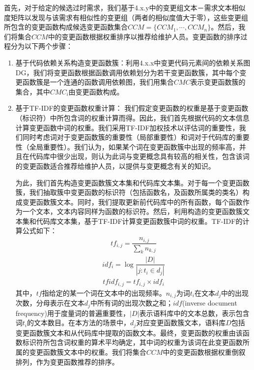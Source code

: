 首先，对于给定的候选过时需求，我们基于4.x.y中的变更组文本－需求文本相似度矩阵以发现与该需求有相似性的变更组（两者的相似度值大于零），这些变更组所包含的变更函数构成候选变更函数集合$CCM = \{CCM_{1}, \cdots, CCM_{n}\}$。然后，我们将集合$CCM$中的变更函数根据权重排序以推荐给维护人员。变更函数的排序过程分为以下两个步骤：
\begin{enumerate}
  \item 基于代码依赖关系构造变更函数簇：利用4.x.x中变更代码元素间的依赖关系图DG，我们将变更函数根据函数调用依赖划分为若干变更函数簇，其中每个变更函数簇是一个连通的函数调用依赖图，我们用集合$CMC$表示变更函数簇的集合，其中$CMC_{i}$由变更函数构成。
  \item 基于TF-IDF的变更函数权重计算：
  我们假定变更函数的权重是基于变更函数（标识符）中所包含词的权重计算而得。因此，我们首先根据代码的文本信息计算变更函数中词的权重。我们采用TF-IDF加权技术以评估词的重要性，我们同时考虑词对于变更函数簇的重要性（局部重要性）和词对于代码库的重要性（全局重要性）。我们认为，如果某个词在变更函数簇中出现的频率高，并且在代码库中很少出现，则认为此词与变更概念具有较高的相关性，包含该词的变更函数适合推荐给维护人员，以提供与变更概念有关的知识。

  为此，我们首先构造变更函数簇文本集和代码库文本集。对于每一个变更函数簇，我们抽取簇中变更函数的标识符（包括函数名，及函数所属类的类名）构成变更函数簇文本。同时，我们提取更新前代码库中的所有函数，每个函数作为一个文本，文本内容同样为函数的标识符。然后，利用构造的变更函数簇文本集和代码库文本集，基于TF-IDF计算变更函数簇中词的权重。TF-IDF的计算公式如下：
  \begin{align}
    tf_{i,j}=\dfrac {n_{i,j}} {\sum _{k}n_{k,j}}
  \end{align}
  \begin{align}
    idf_{i}=\log \dfrac {\left| D\right| } {\left| j:t_{i}\in d_{j}\right| }
  \end{align}
  \begin{align}
    tfidf_{i,j}=tf_{i,j} \times idf_{i}
  \end{align}
  其中，$tf$指给定的某一个词在文本中的出现频率。$n_{i,j}$为词$t_{i}$在文本$d_{j}$中的出现次数，分母表示在文本$d_{j}$中所有词的出现次数之和；$idf$(inverse document frequency)用于度量词的普遍重要性，$\left| D\right|$表示语料库中的文本总数，表示包含词$t_{i}$的文本数目。在本方法的场景中，$d_{j}$对应变更函数簇文本，语料库$D$包括变更函数簇文本和从代码库中提取的函数文本。最终，变更函数的权重由该函数标识符所包含词权重的算术平均确定，其中词的权重为该词在此变更函数所属的变更函数簇文本中的权重。我们将集合$CCM$中的变更函数根据权重倒叙排列，作为变更函数推荐的排序。
\end{enumerate}







